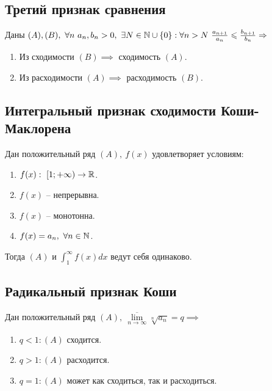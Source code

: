 \subsection{Третий признак сравнения}

\begin{theorem}
    Даны $ (A),(B), \ \forall n \ a_n, b_n > 0, \ \exists N \in \N \cup \{0\}: \forall n > N \ \frac{a_{n+1}}{a_n}\leqslant\frac{b_{n+1}}{b_n} \implies$
    \begin{enumerate}
        \item Из сходимости $(B) \implies$ сходимость $(A)$.
        \item Из расходимости $(A) \implies$ расходимость $(B)$.
    \end{enumerate}
\end{theorem}

\subsection{Интегральный признак сходимости Коши-Маклорена}

\begin{theorem}
    Дан положительный ряд $ (A), \ f(x)$ удовлетворяет условиям:
    \begin{enumerate}
        \item $f(x): \ [1;+\infty) \rightarrow\mathbb{R}$.
        \item $f(x)$ -- непрерывна.
        \item $f(x)$ -- монотонна.
        \item $f(x) = a_n, \ \forall n \in \mathbb{N}$.
    \end{enumerate}

    Тогда $(A)$ и $\int_{1}^{\infty}f(x)dx$ ведут себя одинаково.
\end{theorem}

\subsection{Радикальный признак Коши}

\begin{theorem}
    Дан положительный ряд $(A), \ \underset{n\rightarrow\infty}{\overline{\lim}}\sqrt[n]{a_n} = q\implies $
    \begin{enumerate}
        \item $q < 1: (A)$ сходится.
        \item $q > 1: (A)$ расходится.
        \item $q = 1: (A)$ может как сходиться, так и расходиться.
    \end{enumerate}
\end{theorem}

